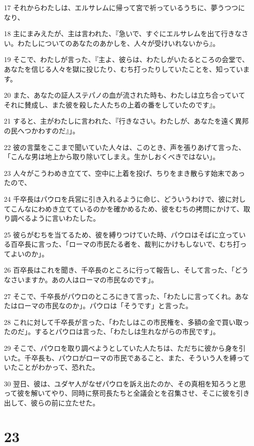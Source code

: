 \par 17 それからわたしは、エルサレムに帰って宮で祈っているうちに、夢うつつになり、
\par 18 主にまみえたが、主は言われた、『急いで、すぐにエルサレムを出て行きなさい。わたしについてのあなたのあかしを、人々が受けいれないから』。
\par 19 そこで、わたしが言った、『主よ、彼らは、わたしがいたるところの会堂で、あなたを信じる人々を獄に投じたり、むち打ったりしていたことを、知っています。
\par 20 また、あなたの証人ステパノの血が流された時も、わたしは立ち合っていてそれに賛成し、また彼を殺した人たちの上着の番をしていたのです』。
\par 21 すると、主がわたしに言われた、『行きなさい。わたしが、あなたを遠く異邦の民へつかわすのだ』」。
\par 22 彼の言葉をここまで聞いていた人々は、このとき、声を張りあげて言った、「こんな男は地上から取り除いてしまえ。生かしおくべきではない」。
\par 23 人々がこうわめき立てて、空中に上着を投げ、ちりをまき散らす始末であったので、
\par 24 千卒長はパウロを兵営に引き入れるように命じ、どういうわけで、彼に対してこんなにわめき立てているのかを確かめるため、彼をむちの拷問にかけて、取り調べるように言いわたした。
\par 25 彼らがむちを当てるため、彼を縛りつけていた時、パウロはそばに立っている百卒長に言った、「ローマの市民たる者を、裁判にかけもしないで、むち打ってよいのか」。
\par 26 百卒長はこれを聞き、千卒長のところに行って報告し、そして言った、「どうなさいますか。あの人はローマの市民なのです」。
\par 27 そこで、千卒長がパウロのところにきて言った、「わたしに言ってくれ。あなたはローマの市民なのか」。パウロは「そうです」と言った。
\par 28 これに対して千卒長が言った、「わたしはこの市民権を、多額の金で買い取ったのだ」。するとパウロは言った、「わたしは生れながらの市民です」。
\par 29 そこで、パウロを取り調べようとしていた人たちは、ただちに彼から身を引いた。千卒長も、パウロがローマの市民であること、また、そういう人を縛っていたことがわかって、恐れた。
\par 30 翌日、彼は、ユダヤ人がなぜパウロを訴え出たのか、その真相を知ろうと思って彼を解いてやり、同時に祭司長たちと全議会とを召集させ、そこに彼を引き出して、彼らの前に立たせた。

\chapter{23}

